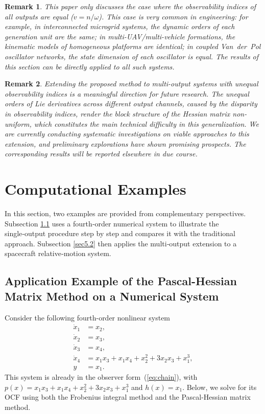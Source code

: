 \documentclass[11pt]{article}
\newtheorem{remark}{Remark}
\begin{document}
\begin{remark}
This paper only discusses the case where the observability indices of all outputs are equal ($v=n/\omega$). This case is very common in engineering: for example, in interconnected microgrid systems, the dynamic orders of each generation unit are the same; in multi-UAV/multi-vehicle formations, the kinematic models of homogeneous platforms are identical; in coupled Van~der~Pol oscillator networks, the state dimension of each oscillator is equal. The results of this section can be directly applied to all such systems. 
\end{remark}
\begin{remark}
	Extending the proposed method to multi-output systems with unequal observability indices is a meaningful direction for future research. The unequal orders of Lie derivatives across different output channels, caused by the disparity in observability indices, render the block structure of the Hessian matrix non-uniform, which constitutes the main technical difficulty in this generalization. We are currently conducting systematic investigations on viable approaches to this extension, and preliminary explorations have shown promising prospects. The corresponding results will be reported elsewhere in due course.
\end{remark}
\section{Computational Examples}\label{sec:example}
In this section, two examples are provided from complementary perspectives. Subsection \ref{sec5.1} uses a fourth‑order numerical system to illustrate the single‑output procedure step by step and compares it with the traditional approach. Subsection \ref{sec5.2} then applies the multi‑output extension to a spacecraft relative‑motion system.

\subsection{Application Example of the Pascal-Hessian Matrix Method on a Numerical System}\label{sec5.1}

Consider the following fourth-order nonlinear system
	\begin{align}
		\dot{x}_1&=x_2,\label{eq:ex-ss1}\\
		\dot{x}_2&=x_3,\\
		\dot{x}_3&=x_4,\\
		\dot{x}_4&=x_1x_3+x_1x_4+x_2^2+3x_2x_3+x_1^3,\label{eq:ex-ss2}\\
		y&=x_1.
	\end{align}
This system is already in the observer form~(\ref{eq:chain}), with $p(x)=x_1x_3+x_1x_4+x_2^2+3x_2x_3+x_1^3$ and $h(x)=x_1$. Below, we solve for its OCF using both the Frobenius integral method and the Pascal-Hessian matrix method.
\end{document}
